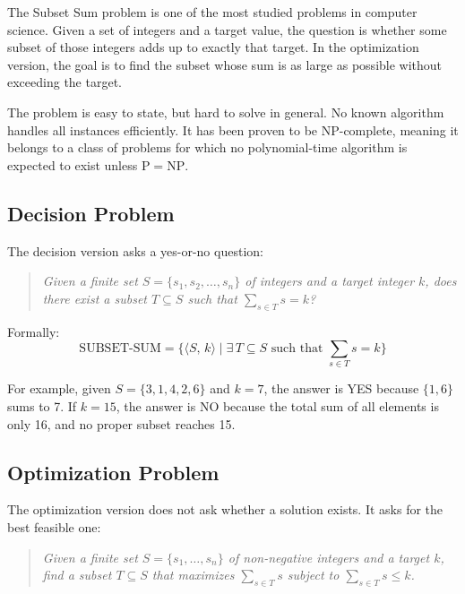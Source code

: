 \documentclass[12pt,a4paper]{article}
\theoremstyle{definition}
\begin{document}
The Subset Sum problem is one of the most studied problems in computer science.
Given a set of integers and a target value, the question is whether some subset
of those integers adds up to exactly that target. In the optimization version, the
goal is to find the subset whose sum is as large as possible without exceeding the target.

The problem is easy to state, but hard to solve in general. No known algorithm
handles all instances efficiently. It has been proven to be NP-complete, meaning
it belongs to a class of problems for which no polynomial-time algorithm is
expected to exist unless $\mathrm{P} = \mathrm{NP}$.

\subsection{Decision Problem}

The decision version asks a yes-or-no question:

\begin{quote}
  \textit{Given a finite set $S = \{s_1, s_2, \ldots, s_n\}$ of integers and
  a target integer $k$, does there exist a subset $T \subseteq S$ such that
  $\sum_{s \in T} s = k$?}
\end{quote}

Formally:
\[
  \mathrm{SUBSET\text{-}SUM}
    = \bigl\{\langle S,\, k \rangle
       \mid \exists\, T \subseteq S \text{ such that } \textstyle\sum_{s \in T} s = k
      \bigr\}
\]

For example, given $S = \{3, 1, 4, 2, 6\}$ and $k = 7$, the answer is YES
because $\{1, 6\}$ sums to 7. If $k = 15$, the answer is NO because the
total sum of all elements is only 16, and no proper subset reaches 15.

\subsection{Optimization Problem}

The optimization version does not ask whether a solution exists. It asks for
the best feasible one:

\begin{quote}
  \textit{Given a finite set $S = \{s_1, \ldots, s_n\}$ of non-negative integers
  and a target $k$, find a subset $T \subseteq S$ that maximizes
  $\sum_{s \in T} s$ subject to $\sum_{s \in T} s \leq k$.}
\end{quote}
\end{document}
